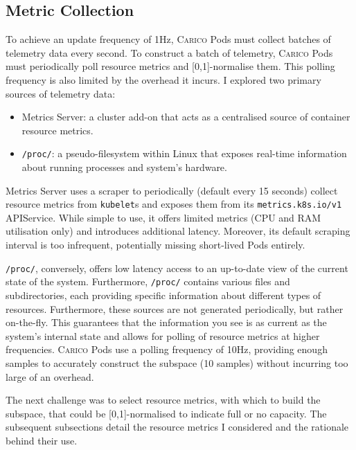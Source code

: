 \subsection{Metric Collection}
To achieve an update frequency of 1Hz, \textsc{Carico} Pods must collect batches
of telemetry data every second. To construct a batch of telemetry,
\textsc{Carico} Pods must periodically poll resource metrics and [0,1]-normalise
them. This polling frequency is also limited by the overhead it incurs. I
explored two primary sources of telemetry data:
\begin{itemize}
    \item Metrics Server: a cluster add-on that acts as a centralised source of
        container resource metrics.
    \item \verb|/proc/|: a pseudo-filesystem within Linux that exposes real-time
        information about running processes and system's hardware.
\end{itemize}

Metrics Server uses a scraper to periodically (default every 15 seconds) collect
resource metrics from \texttt{kubelet}s and exposes them from its
\verb|metrics.k8s.io/v1| APIService. While simple to use, it offers limited
metrics (CPU and RAM utilisation only) and introduces additional latency.
Moreover, its default scraping interval is too infrequent, potentially missing
short-lived Pods entirely.

\verb|/proc/|, conversely, offers low latency access to an up-to-date view
of the current state of the system. Furthermore, \verb|/proc/| contains various
files and subdirectories, each providing specific information about different
types of resources. Furthermore, these sources are not generated periodically,
but rather on-the-fly. This guarantees that the information you see is as
current as the system's internal state and allows for polling of resource
metrics at higher frequencies. \textsc{Carico} Pods use a polling
frequency of 10Hz, providing enough samples to accurately construct the subspace
(10 samples) without incurring too large of an overhead.

The next challenge was to select resource metrics, with which to build the
subspace, that could be [0,1]-normalised to indicate full or no capacity. The
subsequent subsections detail the resource metrics I considered and the
rationale behind their use.

